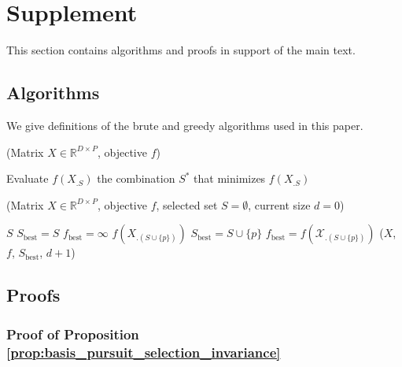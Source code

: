 \section{Supplement}

This section contains algorithms and proofs in support of the main text.

\subsection{Algorithms}
\label{sec:algorithms}

We give definitions of the brute and greedy algorithms used in this paper.

\begin{algorithm}[H]
\caption{\brute(Matrix ${X} \in \mathbb{R}^{D \times P}$, objective $f$)}
\begin{algorithmic}[1]
    \STATE Evaluate $f({X}_{.S})$
\ENDFOR
{} the combination $S^*$ that minimizes $f({X}_{.S})$
\end{algorithmic}
\end{algorithm}

\begin{algorithm}[H]
\caption{\greedy(Matrix ${X} \in \mathbb{R}^{D \times P}$, objective $f$, selected set $S = \emptyset$, current size $d=0$)}
\begin{algorithmic}[1]
     $S$
\ELSE
     $S_{\text{best}} = S$
     $f_{\text{best}} = \infty$
         $f({X}_{.(S \cup \{p\})})$
             $S_{\text{best}} = S \cup \{p\}$
             $f_{\text{best}} = f(\mathcal{X}_{.(S \cup \{p\})})$
        \ENDIF
    \ENDFOR
     \greedy(${X}$, $f$, $S_{\text{best}}$, $d+1$)
\ENDIF
\end{algorithmic}
\end{algorithm}

\subsection{Proofs}
\label{sec:proofs}

\subsubsection{Proof of Proposition \ref{prop:basis_pursuit_selection_invariance}}
\label{proof:basis_pursuit_program_invariance}

